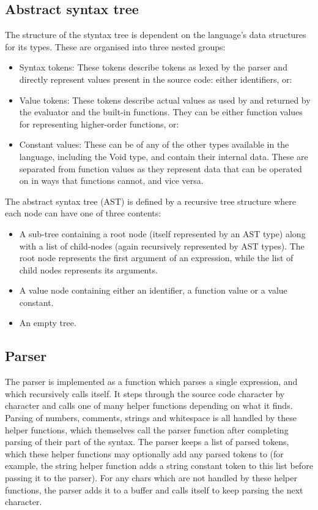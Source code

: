\documentclass[11pt]{article}
\begin{document}
\subsection{Abstract syntax tree}
    The structure of the styntax tree is dependent on the language's data structures for its types. These are organised into three nested groups:
    \begin{itemize}
        \item Syntax tokens: \newline
              These tokens describe tokens as lexed by the parser and directly represent values present in the source code:
              either identifiers, or:
        \item Value tokens: \newline
              These tokens describe actual values as used by and returned by the evaluator and the built-in functions. They can be either function
              values for representing higher-order functions, or:
        \item Constant values: \newline
              These can be of any of the other types available in the language, including the Void type, and contain their internal data.
              These are separated from function values as they represent data that can be operated on in ways that functions cannot, and vice versa.
    \end{itemize}
    The abstract syntax tree (AST) is defined by a recursive tree structure where each node can have one of three contents:
    \begin{itemize}
        \item A sub-tree containing a root node (itself represented by an AST type) along with a list of child-nodes (again recursively
              represented by AST types). The root node represents the first argument of an expression, while the list of child nodes represents
              its arguments.
        \item A value node containing either an identifier, a function value or a value constant.
        \item An empty tree.
    \end{itemize}

\subsection{Parser}

    The parser is implemented as a function which parses a single expression, and which recursively calls itself. It steps through the source code
    character by character and calls one of many helper functions depending on what it finds. Parsing of numbers, comments, strings and whitespace is all
    handled by these helper functions, which themselves call the parser function after completing parsing of their part of the syntax. The parser
    keeps a list of parsed tokens, which these helper functions may optionally add any parsed tokens to (for example, the string helper function
    adds a string constant token to this list before passing it to the parser). For any chars which are not handled by these helper functions,
    the parser adds it to a buffer and calls itself to keep parsing the next character.
\end{document}
